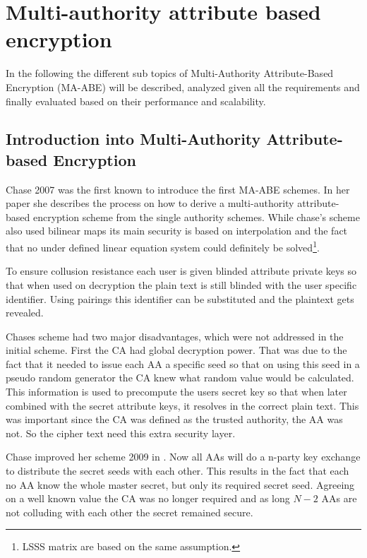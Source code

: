 \section{Multi-authority attribute based encryption}
In the following the different sub topics of Multi-Authority Attribute-Based Encryption (\ac{MA-ABE}) will be described, analyzed given all the requirements and finally evaluated based on their performance and scalability. 

\subsection{Introduction into Multi-Authority Attribute-based Encryption}
Chase 2007 \cite{chase2007multi} was the first known to introduce the first \ac{MA-ABE} schemes. In her paper she describes the process on how to derive a multi-authority attribute-based encryption scheme from the single authority schemes. While chase's scheme also used bilinear maps its main security is based on interpolation and the fact that no under defined linear equation system could definitely be solved\footnote{\ac{LSSS} matrix are based on the same assumption.}.  

To ensure collusion resistance each user is given blinded attribute private keys so that when used on decryption the plain text is still blinded with the user specific identifier. Using pairings this identifier can be substituted and the plaintext gets revealed. 

Chases scheme had two major disadvantages, which were not addressed in the initial scheme. First the \ac{CA} had global decryption power. That was due to the fact that it needed to issue each \ac{AA} a specific seed so that on using this seed in a pseudo random generator the \ac{CA} knew what random value would be calculated. This information is used to precompute the users secret key so that when later combined with the secret attribute keys, it resolves in the correct plain text. This was important since the CA was defined as the trusted authority, the AA was not. So the cipher text need this extra security layer.  

Chase improved her scheme 2009 in \cite{chase2009improving}. Now all \ac{AA}s will do a n-party key exchange to distribute the secret seeds with each other. This results in the fact that each no AA know the whole master secret, but only its required secret seed. Agreeing on a well known value the \ac{CA} was no longer required and as long $N-2$ \ac{AA}s are not colluding with each other the secret remained secure. 

